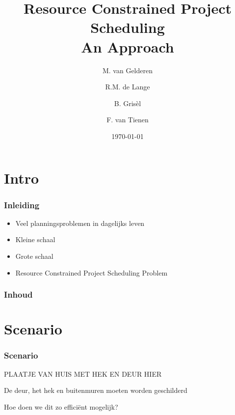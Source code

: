 \documentclass{beamer}
\title[RCPS]{Resource Constrained Project Scheduling\\
An Approach}
\author{M. van Gelderen  \and
    R.M. de Lange \and
    B. Gris\`el \and
    F. van Tienen}
\institute{TU Delft}
\date{\today}
\theoremstyle{definition}
\begin{document}
\begin{frame}
\titlepage
\end{frame}

\section*{Intro}
\begin{frame}
  \frametitle{Inleiding}
  \begin{itemize}
		\item Veel planningsproblemen in dagelijks leven
		\item Kleine schaal
		\item Grote schaal
		\item Resource Constrained Project Scheduling Problem
  \end{itemize}
\end{frame}

\begin{frame}
    \frametitle{Inhoud}
    \tableofcontents
\end{frame}


\section{Scenario}

\begin{frame}
    \frametitle{Scenario}
    PLAATJE VAN HUIS MET HEK EN DEUR HIER
    
    \begin{center}
    	De deur, het hek en buitenmuren moeten worden geschilderd
    \end{center}
\end{frame}

\begin{frame}
    \begin{center}
    	Hoe doen we dit zo effici\"{e}nt mogelijk?
    \end{center}
\end{frame}
\end{document}
